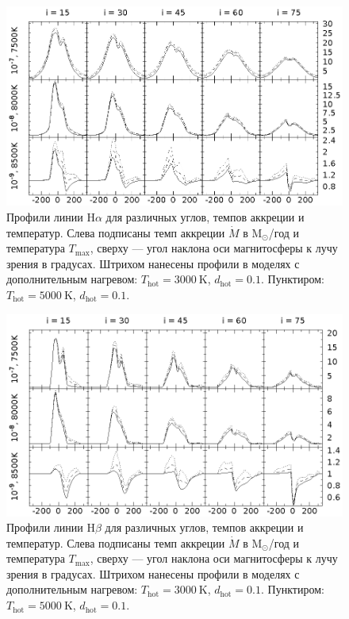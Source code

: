 \documentclass[12pt]{article}
\begin{document}
 


\begin{figure}[h]
\centering
\includegraphics[width=\textwidth]{hot_5_Ha.eps}
\caption{Профили линии $\text{H}\alpha$ для различных углов, темпов аккреции и температур. Слева подписаны темп аккреции $\dot{M}$ в $\text{M}_\odot$/год и температура $T_\text{max}$, сверху --- угол наклона оси магнитосферы к лучу зрения в градусах. Штрихом нанесены профили в моделях с дополнительным нагревом: $T_\text{hot} = 3000\ \text{K}$, $d_\text{hot} = 0.1$. Пунктиром: $T_\text{hot} = 5000\ \text{K}$, $d_\text{hot} = 0.1$.}
\label{fig:Ha}
\end{figure}
\begin{figure}[h]
\centering
\includegraphics[width=\textwidth]{hot_5_Hb.eps}
\caption{Профили линии $\text{H}\beta$ для различных углов, темпов аккреции и температур. Слева подписаны темп аккреции $\dot{M}$ в $\text{M}_\odot$/год и температура $T_\text{max}$, сверху --- угол наклона оси магнитосферы к лучу зрения в градусах. Штрихом нанесены профили в моделях с дополнительным нагревом: $T_\text{hot} = 3000\ \text{K}$, $d_\text{hot} = 0.1$. Пунктиром: $T_\text{hot} = 5000\ \text{K}$, $d_\text{hot} = 0.1$.}
\label{fig:Hb}
\end{figure}
\end{document}
